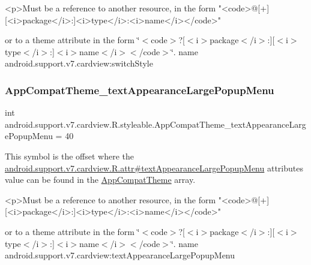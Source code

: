 \begin{DoxyVerb}      <p>Must be a reference to another resource, in the form "<code>@[+][<i>package</i>:]<i>type</i>:<i>name</i></code>"
\end{DoxyVerb}
 or to a theme attribute in the form \char`\"{}$<$code$>$?\mbox{[}$<$i$>$package$<$/i$>$\+:\mbox{]}\mbox{[}$<$i$>$type$<$/i$>$\+:\mbox{]}$<$i$>$name$<$/i$>$$<$/code$>$\char`\"{}.  name android.\+support.\+v7.\+cardview\+:switch\+Style \mbox{\label{classandroid_1_1support_1_1v7_1_1cardview_1_1R_1_1styleable_afe291a8800123e67953b2ed9511c4a9a}} 
\subsubsection{\texorpdfstring{App\+Compat\+Theme\+\_\+text\+Appearance\+Large\+Popup\+Menu}{AppCompatTheme\_textAppearanceLargePopupMenu}}
{\footnotesize\ttfamily int android.\+support.\+v7.\+cardview.\+R.\+styleable.\+App\+Compat\+Theme\+\_\+text\+Appearance\+Large\+Popup\+Menu = 40\hspace{0.3cm}{\ttfamily [static]}}

This symbol is the offset where the \hyperlink{classandroid_1_1support_1_1v7_1_1cardview_1_1R_1_1attr_ae017936149061e07ad19fbf80ad512c0}{android.\+support.\+v7.\+cardview.\+R.\+attr\#text\+Appearance\+Large\+Popup\+Menu} attribute\textquotesingle{}s value can be found in the \hyperlink{classandroid_1_1support_1_1v7_1_1cardview_1_1R_1_1styleable_a52e6f69f954ecc2622d72c0b4d298938}{App\+Compat\+Theme} array.

\begin{DoxyVerb}      <p>Must be a reference to another resource, in the form "<code>@[+][<i>package</i>:]<i>type</i>:<i>name</i></code>"
\end{DoxyVerb}
 or to a theme attribute in the form \char`\"{}$<$code$>$?\mbox{[}$<$i$>$package$<$/i$>$\+:\mbox{]}\mbox{[}$<$i$>$type$<$/i$>$\+:\mbox{]}$<$i$>$name$<$/i$>$$<$/code$>$\char`\"{}.  name android.\+support.\+v7.\+cardview\+:text\+Appearance\+Large\+Popup\+Menu \mbox{\label{classandroid_1_1support_1_1v7_1_1cardview_1_1R_1_1styleable_a8f72667dec9ee05cdbf2e2619848768c}} 
